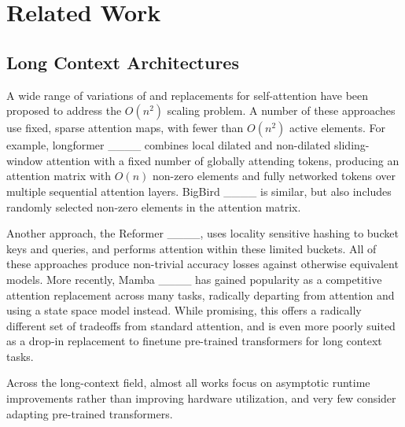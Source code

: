 \section{Related Work}
\subsection{Long Context Architectures}
A wide range of variations of and replacements for self-attention have been proposed to address the $O(n^2)$ scaling problem.  A number of these approaches use fixed, sparse attention maps, with fewer than $O(n^2)$ active elements.  For example, longformer ____ combines local dilated and non-dilated sliding-window attention with a fixed number of globally attending tokens, producing an attention matrix with $O(n)$ non-zero elements and fully networked tokens over multiple sequential attention layers.  BigBird ____ is similar, but also includes randomly selected non-zero elements in the attention matrix. \par Another approach, the Reformer ____, uses locality sensitive hashing to bucket keys and queries, and performs attention within these limited buckets.  All of these approaches produce non-trivial accuracy losses against otherwise equivalent models.  More recently, Mamba ____ has gained popularity as a competitive attention replacement across many tasks, radically departing from attention and using a state space model instead.  While promising, this offers a radically different set of tradeoffs from standard attention, and is even more poorly suited as a drop-in replacement to finetune pre-trained transformers for long context tasks.  
\par Across the long-context field, almost all works focus on asymptotic runtime improvements rather than improving hardware utilization, and very few consider adapting pre-trained transformers.

